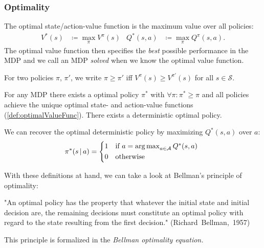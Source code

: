 			\subsubsection{Optimality}
				\begin{definition}[Optimality]  \label{def:optimalValueFunc}
					The optimal state/action-value function is the maximum value over all policies:
					\begin{align}
						V^\ast(s)    & \coloneqq \max_\pi V^\pi(s)     &
						Q^\ast(s, a) & \coloneqq \max_\pi Q^\pi(s, a).
					\end{align}
					The optimal value function then specifies the \emph{best} possible performance in the \ac{MDP} and we call an \ac{MDP} \emph{solved} when we know the optimal value function.
				\end{definition}
				\begin{definition}
					For two policies \(\pi\), \(\pi'\), we write \( \pi \geq \pi' \) iff \( V^\pi(s) \geq V^{\pi'}(s) \) for all \( s \in \mathcal{S} \).
				\end{definition}
				\begin{theorem}
					For any \acl{MDP} there exists a optimal policy \(\pi^\ast\) with \( \forall \pi : \pi^\ast \geq \pi \) and all policies achieve the unique optimal state- and action-value functions (\autoref{def:optimalValueFunc}). There exists a deterministic optimal policy.
				\end{theorem}
				\begin{remark}
					We can recover the optimal deterministic policy by maximizing \(Q^\ast(s, a)\) over \(a\):
					\begin{equation}
						\pi^\ast(s \given a) =
						\begin{cases*}
							1 & if \( a = \argmax_{a \in \mathcal{A}} Q^\ast(s, a) \) \\
							0 & otherwise
						\end{cases*}
					\end{equation}
				\end{remark}

				With these definitions at hand, we can take a look at Bellman's principle of optimality:
				\begin{center}
					"An optimal policy has the property that whatever the initial state and initial decision are, the remaining decisions must constitute an optimal policy with regard to the state resulting from the first decision." (Richard~Bellman,~1957)
				\end{center}
				This principle is formalized in the \emph{Bellman optimality equation.}

